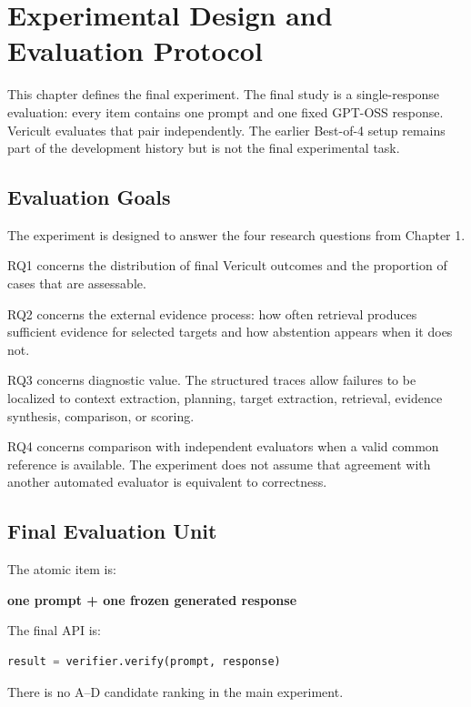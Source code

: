 \chapter{Experimental Design and Evaluation Protocol}
\label{chap:experiment}

This chapter defines the final experiment. The final study is a single-response evaluation: every item contains one prompt and one fixed GPT-OSS response. Vericult evaluates that pair independently. The earlier Best-of-4 setup remains part of the development history but is not the final experimental task.

\section{Evaluation Goals}

The experiment is designed to answer the four research questions from Chapter 1.

RQ1 concerns the distribution of final Vericult outcomes and the proportion of cases that are assessable.

RQ2 concerns the external evidence process: how often retrieval produces sufficient evidence for selected targets and how abstention appears when it does not.

RQ3 concerns diagnostic value. The structured traces allow failures to be localized to context extraction, planning, target extraction, retrieval, evidence synthesis, comparison, or scoring.

RQ4 concerns comparison with independent evaluators when a valid common reference is available. The experiment does not assume that agreement with another automated evaluator is equivalent to correctness.

\section{Final Evaluation Unit}

The atomic item is:

\begin{center}
\textbf{one prompt + one frozen generated response}
\end{center}

The final API is:

\begin{lstlisting}[language=Python]
result = verifier.verify(prompt, response)
\end{lstlisting}

There is no A--D candidate ranking in the main experiment.

